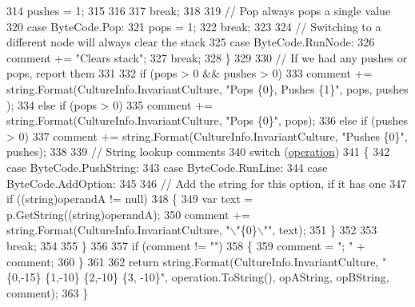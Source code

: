 \begin{DoxyCode}
314                         pushes = 1;
315 
316 
317                     \textcolor{keywordflow}{break};
318 
319                 \textcolor{comment}{// Pop always pops a single value}
320                 \textcolor{keywordflow}{case} ByteCode.Pop:
321                     pops = 1;
322                     \textcolor{keywordflow}{break};
323 
324                 \textcolor{comment}{// Switching to a different node will always clear the stack}
325                 \textcolor{keywordflow}{case} ByteCode.RunNode:
326                     comment += \textcolor{stringliteral}{"Clears stack"};
327                     \textcolor{keywordflow}{break};
328             \}
329 
330             \textcolor{comment}{// If we had any pushes or pops, report them}
331 
332             \textcolor{keywordflow}{if} (pops > 0 && pushes > 0)
333                 comment += string.Format(CultureInfo.InvariantCulture, \textcolor{stringliteral}{"Pops \{0\}, Pushes \{1\}"}, pops, pushes
      );
334             \textcolor{keywordflow}{else} \textcolor{keywordflow}{if} (pops > 0)
335                 comment += string.Format(CultureInfo.InvariantCulture, \textcolor{stringliteral}{"Pops \{0\}"}, pops);
336             \textcolor{keywordflow}{else} \textcolor{keywordflow}{if} (pushes > 0)
337                 comment += string.Format(CultureInfo.InvariantCulture, \textcolor{stringliteral}{"Pushes \{0\}"}, pushes);
338 
339             \textcolor{comment}{// String lookup comments}
340             \textcolor{keywordflow}{switch} (\hyperlink{a00121_a566bf5f7198cc353ea5c3710cb3a31cb}{operation})
341             \{
342                 \textcolor{keywordflow}{case} ByteCode.PushString:
343                 \textcolor{keywordflow}{case} ByteCode.RunLine:
344                 \textcolor{keywordflow}{case} ByteCode.AddOption:
345 
346                     \textcolor{comment}{// Add the string for this option, if it has one}
347                     \textcolor{keywordflow}{if} ((\textcolor{keywordtype}{string})operandA != null)
348                     \{
349                         var text = p.GetString((string)operandA);
350                         comment += string.Format(CultureInfo.InvariantCulture, \textcolor{stringliteral}{"\(\backslash\)"\{0\}\(\backslash\)""}, text);
351                     \}
352 
353                     \textcolor{keywordflow}{break};
354 
355             \}
356 
357             \textcolor{keywordflow}{if} (comment != \textcolor{stringliteral}{""})
358             \{
359                 comment = \textcolor{stringliteral}{"; "} + comment;
360             \}
361 
362             \textcolor{keywordflow}{return} string.Format(CultureInfo.InvariantCulture, \textcolor{stringliteral}{"\{0,-15\} \{1,-10\} \{2,-10\} \{3, -10\}"}, 
      operation.ToString(), opAString, opBString, comment);
363         \}
\end{DoxyCode}


